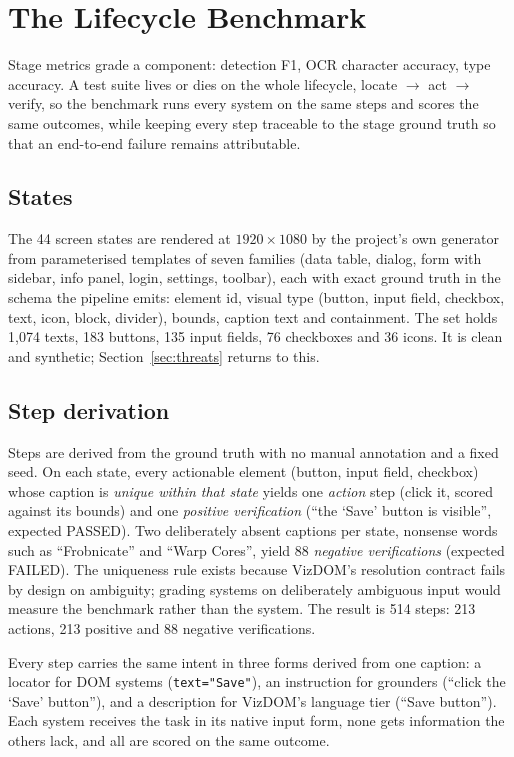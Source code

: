 \documentclass[conference]{IEEEtran}
\newcommand{\code}[1]{\texttt{#1}}
\begin{document}
\section{The Lifecycle Benchmark}
\label{sec:bench}
Stage metrics grade a component: detection F1, OCR character accuracy, type accuracy. A test suite lives or dies on the whole lifecycle, locate $\rightarrow$ act $\rightarrow$ verify, so the benchmark runs every system on the same steps and scores the same outcomes, while keeping every step traceable to the stage ground truth so that an end-to-end failure remains attributable.

\subsection{States}
The 44 screen states are rendered at $1920\times1080$ by the project's own generator from parameterised templates of seven families (data table, dialog, form with sidebar, info panel, login, settings, toolbar), each with exact ground truth in the schema the pipeline emits: element id, visual type (button, input field, checkbox, text, icon, block, divider), bounds, caption text and containment. The set holds 1,074 texts, 183 buttons, 135 input fields, 76 checkboxes and 36 icons. It is clean and synthetic; Section~\ref{sec:threats} returns to this.

\subsection{Step derivation}
Steps are derived from the ground truth with no manual annotation and a fixed seed. On each state, every actionable element (button, input field, checkbox) whose caption is \emph{unique within that state} yields one \emph{action} step (click it, scored against its bounds) and one \emph{positive verification} (``the `Save' button is visible'', expected PASSED). Two deliberately absent captions per state, nonsense words such as ``Frobnicate'' and ``Warp Cores'', yield 88 \emph{negative verifications} (expected FAILED). The uniqueness rule exists because VizDOM's resolution contract fails by design on ambiguity; grading systems on deliberately ambiguous input would measure the benchmark rather than the system. The result is 514 steps: 213 actions, 213 positive and 88 negative verifications.

Every step carries the same intent in three forms derived from one caption: a locator for DOM systems (\code{text="Save"}), an instruction for grounders (``click the `Save' button''), and a description for VizDOM's language tier (``Save button''). Each system receives the task in its native input form, none gets information the others lack, and all are scored on the same outcome.
\end{document}
